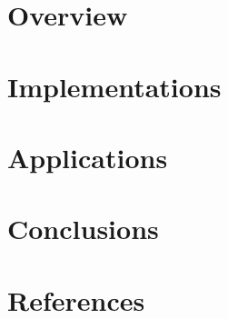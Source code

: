 \section[Overview]{Overview}


\section[Impl]{Implementations}


\section[Apps]{Applications}


\section[Concl]{Conclusions}


\section[Refs]{References}
